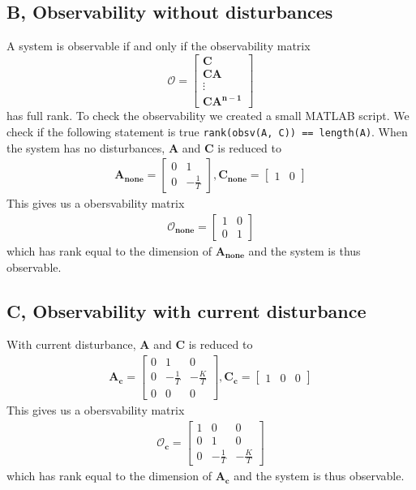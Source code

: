\subsection{B, Observability without disturbances}
A system is observable if and only if the observability matrix 
\begin{equation}
    \mathcal{O} = 
	\begin{bmatrix}
        \mathbf{C}\\
        \mathbf{CA}\\
        \vdots\\
        \mathbf{CA^{n-1}}
    \end{bmatrix}
    \label{eq:observability_matrix}
\end{equation}
has full rank\cite{Chen2014}. To check the observability we created a small MATLAB script. We check if the following statement is true \lstinline{rank(obsv(A, C)) == length(A)}. When the system has no disturbances, $\mathbf{A}$ and $\mathbf{C}$ is reduced to 
\begin{align*}
    \mathbf{A_{none}} = 
    \begin{bmatrix}
        0 & 1\\
        0 & -\frac{1}{T}
    \end{bmatrix}
    ,
    \mathbf{C_{none}} =  
    \begin{bmatrix}
        1 & 0
    \end{bmatrix}
\end{align*}
This gives us a obersvability matrix
\begin{align}
    \mathbf{\mathcal{O}_{none}} = 
    \begin{bmatrix}
        1 & 0\\
        0 & 1
    \end{bmatrix}
\end{align}
which has rank equal to the dimension of $\mathbf{A_{none}}$ and the system is thus observable.
\subsection{C, Observability with current disturbance}
With current disturbance, $\mathbf{A}$ and $\mathbf{C}$ is reduced to 
\begin{align*}
    \mathbf{A_c} = 
    \begin{bmatrix}
        0 & 1 & 0\\
        0 & -\frac{1}{T} & -\frac{K}{T}\\
        0 & 0 & 0
    \end{bmatrix}
    ,
    \mathbf{C_c} =  
    \begin{bmatrix}
        1 & 0 & 0
    \end{bmatrix}
\end{align*}
This gives us a obersvability matrix
\begin{align}
    \mathbf{\mathcal{O}_{c}} = 
    \begin{bmatrix}
        1 & 0 & 0\\
        0 & 1 & 0\\
        0 & -\frac{1}{T} & -\frac{K}{T}
    \end{bmatrix}
\end{align}
which has rank equal to the dimension of $\mathbf{A_{c}}$ and the system is thus observable.
